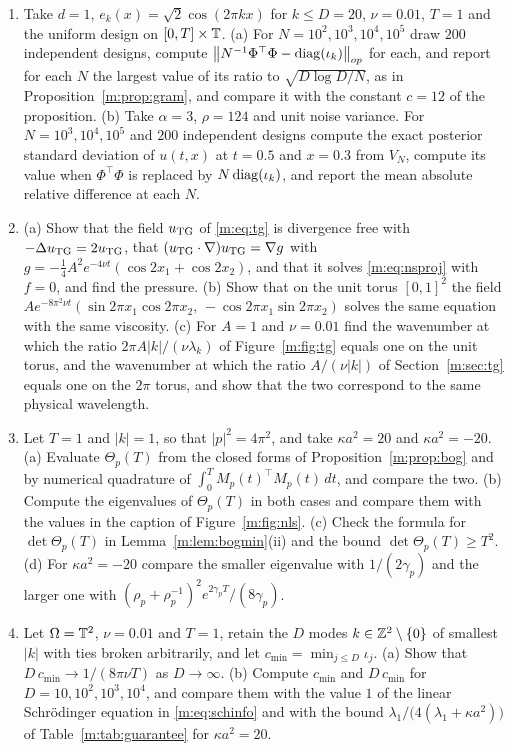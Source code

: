 \begin{enumerate}
\item Take $d=1$, $e_k(x)=\sqrt2\cos(2\pi kx)$ for $k\le D=20$, $\nu=0.01$, $T=1$ and the uniform design on $[0,T]\times\mathbb{T}$. (a) For $N=10^2,10^3,10^4,10^5$ draw $200$ independent designs, compute $\left\|N^{-1}\Phi^\top\Phi-\operatorname{diag}(\iota_k)\right\|_{op}$ for each, and report for each $N$ the largest value of its ratio to $\sqrt{D\log D/N}$, as in Proposition~\ref{m:prop:gram}, and compare it with the constant $c=12$ of the proposition. (b) Take $\alpha=3$, $\rho=124$ and unit noise variance. For $N=10^3,10^4,10^5$ and $200$ independent designs compute the exact posterior standard deviation of $u(t,x)$ at $t=0.5$ and $x=0.3$ from $V_N$, compute its value when $\Phi^\top\Phi$ is replaced by $N\operatorname{diag}(\iota_k)$, and report the mean absolute relative difference at each $N$.
\item (a) Show that the field $u_{\rm TG}$ of \eqref{m:eq:tg} is divergence free with $-\Delta u_{\rm TG}=2u_{\rm TG}$, that $(u_{\rm TG}\cdot\nabla)u_{\rm TG}=\nabla g$ with $g=-\tfrac14A^2e^{-4\nu t}(\cos2x_1+\cos2x_2)$, and that it solves \eqref{m:eq:nsproj} with $f=0$, and find the pressure. (b) Show that on the unit torus $[0,1]^2$ the field $Ae^{-8\pi^2\nu t}(\sin2\pi x_1\cos2\pi x_2,\,-\cos2\pi x_1\sin2\pi x_2)$ solves the same equation with the same viscosity. (c) For $A=1$ and $\nu=0.01$ find the wavenumber at which the ratio $2\pi A|k|/(\nu\lambda_k)$ of Figure~\ref{m:fig:tg} equals one on the unit torus, and the wavenumber at which the ratio $A/(\nu|k|)$ of Section~\ref{m:sec:tg} equals one on the $2\pi$ torus, and show that the two correspond to the same physical wavelength.
\item Let $T=1$ and $|k|=1$, so that $|p|^2=4\pi^2$, and take $\kappa a^2=20$ and $\kappa a^2=-20$. (a) Evaluate $\Theta_p(T)$ from the closed forms of Proposition~\ref{m:prop:bog} and by numerical quadrature of $\int_0^TM_p(t)^\top M_p(t)\,dt$, and compare the two. (b) Compute the eigenvalues of $\Theta_p(T)$ in both cases and compare them with the values in the caption of Figure~\ref{m:fig:nls}. (c) Check the formula for $\det\Theta_p(T)$ in Lemma~\ref{m:lem:bogmin}(ii) and the bound $\det\Theta_p(T)\ge T^2$. (d) For $\kappa a^2=-20$ compare the smaller eigenvalue with $1/(2\gamma_p)$ and the larger one with $(\rho_p+\rho_p^{-1})^2e^{2\gamma_pT}/(8\gamma_p)$.
\item Let $\Omega=\mathbb{T}^2$, $\nu=0.01$ and $T=1$, retain the $D$ modes $k\in\mathbb{Z}^2\setminus\{0\}$ of smallest $|k|$ with ties broken arbitrarily, and let $c_{\min}=\min_{j\le D}\iota_j$. (a) Show that $D\,c_{\min}\to1/(8\pi\nu T)$ as $D\to\infty$. (b) Compute $c_{\min}$ and $D\,c_{\min}$ for $D=10,10^2,10^3,10^4$, and compare them with the value $1$ of the linear Schr\"odinger equation in \eqref{m:eq:schinfo} and with the bound $\lambda_1/\big(4(\lambda_1+\kappa a^2)\big)$ of Table~\ref{m:tab:guarantee} for $\kappa a^2=20$.

\end{enumerate}
